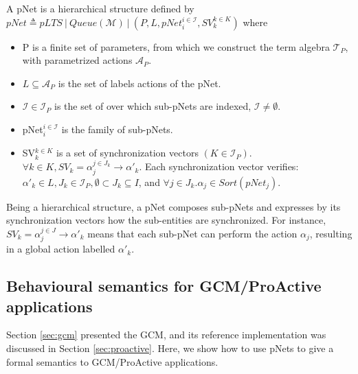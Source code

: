 	\begin{definition}[pNet]
	\label{def:pnet}	
	A pNet is a hierarchical structure defined by 
	$pNet \triangleq pLTS \ | \ Queue(\mathcal{M}) \ | \ (P, L, pNet_i^{i \in \mathcal{I}}, SV_k^{k \in K})$ where
	
	\begin{itemize}
		\item P is a finite set of parameters, from which we construct the term algebra $\mathcal{T}_P$, with
		parametrized actions $\mathcal{A}_P$.
		
		\item $L \subseteq \mathcal{A}_P$ is the set of labels actions of the pNet.
		
		\item $\mathcal{I} \in \mathcal{I}_P$ is the set of over which sub-pNets are indexed, $\mathcal{I} \neq \emptyset$.
		
		\item pNet$_i^{i \in \mathcal{I}}$ is the family of sub-pNets.
		
		\item SV$_k^{k \in K}$ is a set of synchronization vectors $(K \in \mathcal{I}_P)$. 
		$\forall k \in K, SV_k = \alpha_j^{j \in J_k} \rightarrow \alpha'_k$. Each synchronization
		vector verifies: $\alpha'_k \in L, J_k \in \mathcal{I}_P, \emptyset \subset J_k \subseteq I$, and
		$\forall j \in J_k. \alpha_j \in Sort(pNet_j)$.
		
	\end{itemize}
	\end{definition}

	\noindent Being a hierarchical structure, a pNet composes sub-pNets and expresses by its
	synchronization vectors how the sub-entities are synchronized. For instance, 
	$SV_k = \alpha_j^{j \in J} \rightarrow \alpha'_k$
	means that each sub-pNet can perform the action $\alpha_j$, resulting in a global
	action labelled $\alpha'_k$.
	

	
\subsection{Behavioural semantics for GCM/ProActive applications}
\label{sub:pnetsgcm}


		Section \ref{sec:gcm} presented the \ac{GCM}, and its reference implementation
	was discussed in Section \ref{sec:proactive}. Here, we show how to use pNets to
	give a formal semantics to GCM/ProActive applications.
	
